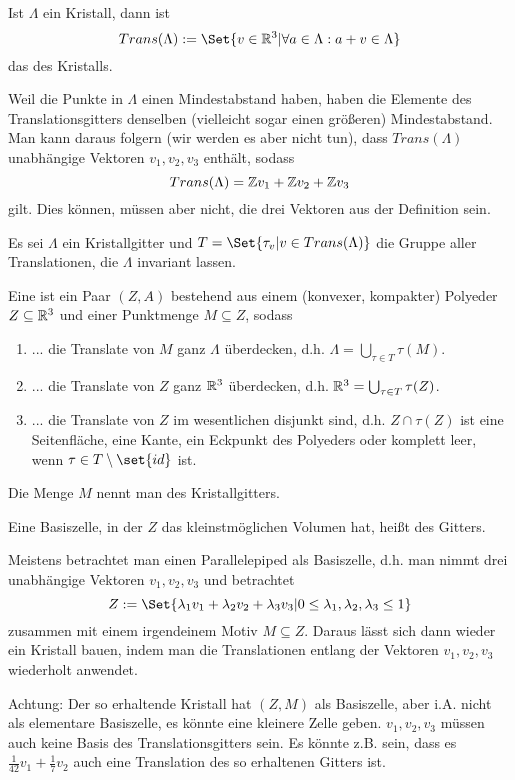 \begin{definition}
Ist $\Lambda$ ein Kristall, dann ist
\[Trans(\Lambda) := \Set{v\in\IR^3 | \forall a\in\Lambda: a+v\in\Lambda}\]
das  des Kristalls.
\end{definition}

\begin{remark}
Weil die Punkte in $\Lambda$ einen Mindestabstand haben, haben die Elemente des Translationsgitters denselben (vielleicht sogar einen größeren) Mindestabstand. Man kann daraus folgern (wir werden es aber nicht tun), dass $Trans(\Lambda)$ unabhängige Vektoren $v_1,v_2,v_3$ enthält, sodass
\[Trans(\Lambda) = \mathbb{Z} v_1+\mathbb{Z} v_2+\mathbb{Z} v_3\]
gilt. Dies können, müssen aber nicht, die drei Vektoren aus der Definition sein.
\end{remark}

\begin{definition}
Es sei $\Lambda$ ein Kristallgitter und $T=\Set{\tau_v | v\in Trans(\Lambda)}$ die Gruppe aller Translationen, die $\Lambda$ invariant lassen.

Eine  ist ein Paar $(Z,A)$ bestehend aus einem (konvexer, kompakter) Polyeder $Z\subseteq\mathbb{R}^3$ und einer Punktmenge $M\subseteq Z$, sodass
\begin{enumerate}
\item ... die Translate von $M$ ganz $\Lambda$ überdecken, d.h. $\Lambda=\bigcup_{\tau\in T} \tau(M)$.
\item ... die Translate von $Z$ ganz $\mathbb{R}^3$ überdecken, d.h. $\mathbb{R}^3 = \bigcup_{\tau\in T} \tau(Z)$.
\item ... die Translate von $Z$ im wesentlichen disjunkt sind, d.h. $Z \cap \tau(Z)$ ist eine Seitenfläche, eine Kante, ein Eckpunkt des Polyeders oder komplett leer, wenn $\tau\in T\setminus\set{id}$ ist.
\end{enumerate}
Die Menge $M$ nennt man  des Kristallgitters.

Eine Basiszelle, in der $Z$ das kleinstmöglichen Volumen hat, heißt  des Gitters.
\end{definition}

\begin{remark}
Meistens betrachtet man einen Parallelepiped als Basiszelle, d.h. man nimmt drei unabhängige Vektoren $v_1,v_2,v_3$ und betrachtet
\[Z:=\Set{\lambda_1v_1+\lambda_2v_2+\lambda_3v_3 | 0\leq\lambda_1,\lambda_2,\lambda_3\leq 1}\]
zusammen mit einem irgendeinem Motiv $M\subseteq Z$. Daraus lässt sich dann wieder ein Kristall bauen, indem man die Translationen entlang der Vektoren $v_1,v_2,v_3$ wiederholt anwendet.

Achtung: Der so erhaltende Kristall hat $(Z,M)$ als Basiszelle, aber i.A. nicht als elementare Basiszelle, es könnte eine kleinere Zelle geben. $v_1,v_2,v_3$ müssen auch keine Basis des Translationsgitters sein. Es könnte z.B. sein, dass es $\frac{1}{42}v_1+\frac{1}{7}v_2$ auch eine Translation des so erhaltenen Gitters ist.
\end{remark}
